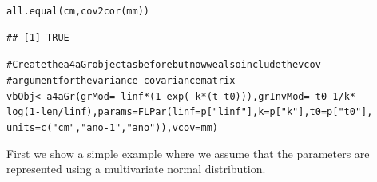 \documentclass[a4paper,english,10pt]{article}\usepackage[]{graphicx}\usepackage[]{color}
\makeatletter
\newcommand{\hlnum}[1]{\textcolor[rgb]{0.2,0.2,0.2}{#1}}%
\newcommand{\hlstr}[1]{\textcolor[rgb]{0.2,0.2,0.2}{#1}}%
\newcommand{\hlcom}[1]{\textcolor[rgb]{0.2,0.267,0.4}{#1}}%
\newcommand{\hlopt}[1]{\textcolor[rgb]{0.2,0.2,0.2}{#1}}%
\newcommand{\hlstd}[1]{\textcolor[rgb]{0,0,0}{#1}}%
\newcommand{\hlkwb}[1]{\textcolor[rgb]{0.361,0.506,0.596}{#1}}%
\newcommand{\hlkwc}[1]{\textcolor[rgb]{0.361,0.506,0.596}{#1}}%
\newcommand{\hlkwd}[1]{\textcolor[rgb]{0.361,0.506,0.596}{#1}}%
\newenvironment{kframe}{%
 \def\at@end@of@kframe{}%
 \ifinner\ifhmode%
  \def\at@end@of@kframe{\end{minipage}}%
  \begin{minipage}{\columnwidth}%
 \fi\fi%
 \def\FrameCommand##1{\hskip\@totalleftmargin \hskip-\fboxsep
 \colorbox{shadecolor}{##1}\hskip-\fboxsep
     \hskip-\linewidth \hskip-\@totalleftmargin \hskip\columnwidth}%
 \MakeFramed {\advance\hsize-\width
   \@totalleftmargin\z@ \linewidth\hsize
   \@setminipage}}%
 {\par\unskip\endMakeFramed%
 \at@end@of@kframe}
\newenvironment{knitrout}{}{} %
\newcommand{\code}[1]{{\texttt{#1}}}
\makeatother
\begin{document}
\begin{knitrout}
\begin{kframe}
\begin{alltt}
\hlkwd{all.equal}\hlstd{(cm,} \hlkwd{cov2cor}\hlstd{(mm))}
\end{alltt}
\begin{verbatim}
## [1] TRUE
\end{verbatim}
\begin{alltt}
\hlcom{# Create the a4aGr object as before but now we also include the vcov}
\hlcom{# argument for the variance-covariance matrix}
\hlstd{vbObj} \hlkwb{<-} \hlkwd{a4aGr}\hlstd{(}\hlkwc{grMod} \hlstd{=} \hlopt{~}\hlstd{linf} \hlopt{*} \hlstd{(}\hlnum{1} \hlopt{-} \hlkwd{exp}\hlstd{(}\hlopt{-}\hlstd{k} \hlopt{*} \hlstd{(t} \hlopt{-} \hlstd{t0))),} \hlkwc{grInvMod} \hlstd{=} \hlopt{~}\hlstd{t0} \hlopt{-} \hlnum{1}\hlopt{/}\hlstd{k} \hlopt{*}
    \hlkwd{log}\hlstd{(}\hlnum{1} \hlopt{-} \hlstd{len}\hlopt{/}\hlstd{linf),} \hlkwc{params} \hlstd{=} \hlkwd{FLPar}\hlstd{(}\hlkwc{linf} \hlstd{= p[}\hlstr{"linf"}\hlstd{],} \hlkwc{k} \hlstd{= p[}\hlstr{"k"}\hlstd{],} \hlkwc{t0} \hlstd{= p[}\hlstr{"t0"}\hlstd{],}
    \hlkwc{units} \hlstd{=} \hlkwd{c}\hlstd{(}\hlstr{"cm"}\hlstd{,} \hlstr{"ano-1"}\hlstd{,} \hlstr{"ano"}\hlstd{)),} \hlkwc{vcov} \hlstd{= mm)}
\end{alltt}
\end{kframe}
\end{knitrout}


First we show a simple example where we assume that the parameters are represented using a multivariate normal distribution.
\end{document}
